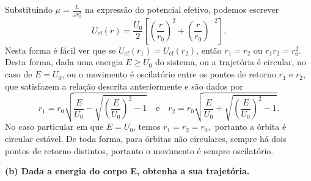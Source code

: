 Substituindo \(\mu = \frac{L}{\omega r_0^2}\) na expressão do potencial efetivo, podemos escrever
\begin{equation}
    U_\mathrm{ef}(r) = \frac{U_0}{2}\left[\left(\frac{r}{r_0}\right)^2 + \left(\frac{r}{r_0}\right)^{-2}\right].
\end{equation}
Nesta forma é fácil ver que se \(U_\mathrm{ef}(r_1) = U_\mathrm{ef}(r_2)\), então \(r_1 = r_2\) ou \(r_1r_2 = r_0^2\). Desta forma, dada uma energia \(E \geq U_0\) do sistema, ou a trajetória é circular, no caso de \(E = U_0\), ou o movimento é oscilatório entre os pontos de retorno \(r_1\) e \(r_2\), que satisfazem a relação descrita anteriormente e são dados por
\begin{equation}
    r_1 = r_0\sqrt{\frac{E}{U_0} - \sqrt{\left(\frac{E}{U_0}\right)^2 - 1}}\quad\text{e}\quad r_2 = r_0\sqrt{\frac{E}{U_0} + \sqrt{\left(\frac{E}{U_0}\right)^2 - 1}}.
\end{equation}
No caso particular em que \(E = U_0\), temos \(r_1 = r_2 = r_0,\) portanto a órbita é circular estável. De toda forma, para órbitas não circulares, sempre há dois pontos de retorno distintos, portanto o movimento é sempre oscilatório.

\textbf{(b) Dada a energia do corpo E, obtenha a sua trajetória.}

